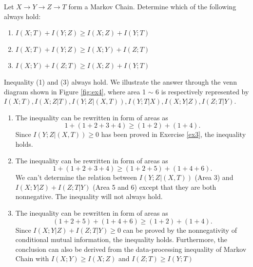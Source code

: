 \begin{exercise}[]{Let $X \rightarrow Y \rightarrow Z \rightarrow T$ form a Markov Chain. Determine which of the following always hold:
  \begin{enumerate}
    \item $I(X;T)+I(Y;Z) \ge I(X;Z)+I(Y;T)$
    \item $I(X;T)+I(Y;Z) \ge I(X;Y)+I(Z;T)$
    \item $I(X;Y)+I(Z;T) \ge I(X;Z)+I(Y;T)$
  \end{enumerate}
}
  \begin{solution}
    Inequality (1) and (3) always hold. We illustrate the answer through the venn diagram shown in Figure \ref{fig:ex4}, where area 1 $\sim$ 6 is respectively represented by $I(X;T),I(X;Z|T),I(Y;Z|(X,T)),I(Y;T|X),I(X;Y|Z),I(Z;T|Y)$.
    \begin{enumerate}
      \item {
        The inequality can be rewritten in form of areas as
        $$1+(1+2+3+4)\ge (1+2)+(1+4).$$
        Since $I(Y;Z|(X,T))\ge 0$ has been proved in Exercise \ref{ex3}, the inequality holds.
      }
      \item {
        The inequality can be rewritten in form of areas as
        $$1+(1+2+3+4)\ge (1+2+5)+(1+4+6).$$
        We can't determine the relation between $I(Y;Z|(X,T))$ (Area 3) and $I(X;Y|Z)+I(Z;T|Y)$ (Area 5 and 6) except that they are both nonnegative. The inequality will not always hold.
      }
      \item {
        The inequality can be rewritten in form of areas as
        $$(1+2+5)+(1+4+6)\ge (1+2)+(1+4).$$
        Since $I(X;Y|Z)+I(Z;T|Y) \ge 0$ can be proved by the nonnegativity of conditional mutual information, the inequality holds.
        Furthermore, the conclusion can also be derived from the data-processing inequality of Markov Chain with $I(X;Y)\ge I(X;Z)$ and $I(Z;T)\ge I(Y;T)$
      }
    \end{enumerate}
  \end{solution}
\end{exercise}



